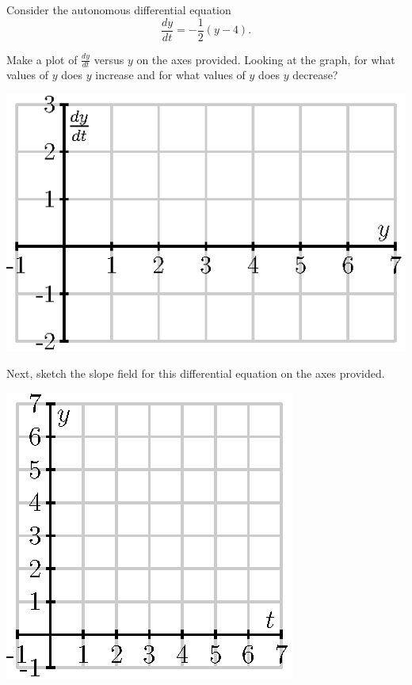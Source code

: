 \begin{activity} \label{A:7.2.1}  
  Consider the autonomous differential equation 
$$
\frac{dy}{dt} = -\frac 12( y - 4).
$$

\ba
\item Make a plot of $\frac{dy}{dt}$ versus $y$ on the axes provided.  Looking at the
  graph, for what values of $y$ does $y$ increase and for what values of $y$
  does $y$ decrease?

  \begin{center}
    \includegraphics{figures/7_2_Act1_1.eps}
  \end{center}

\item Next, sketch the slope field for this differential equation on the axes provided.

  \begin{center}
    \includegraphics{figures/7_2_Act1_2.eps}
  \end{center}


\end{activity}
